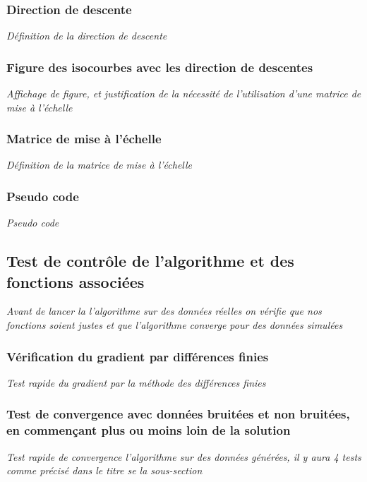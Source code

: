 \documentclass{article}
\begin{document}
\subsubsection{Direction de descente}
\textit{Définition de la direction de descente}

\subsubsection{Figure des isocourbes avec les direction de descentes}
\textit{Affichage de figure, et justification de la nécessité de l'utilisation d'une matrice de mise à l'échelle}

\subsubsection{Matrice de mise à l'échelle}
\textit{Définition de la matrice de mise à l'échelle}

\subsubsection{Pseudo code}
\textit{Pseudo code}

\subsection{Test de contrôle de l'algorithme et des fonctions associées}
\textit{Avant de lancer la l'algorithme sur des données réelles on vérifie que nos fonctions soient justes et que l'algorithme converge pour des données simulées}

\subsubsection{Vérification du gradient par différences finies}
\textit{Test rapide du gradient par la méthode des différences finies}

\subsubsection{Test de convergence avec données bruitées et non bruitées, en commençant plus ou moins loin de la solution}
\textit{Test rapide de convergence l'algorithme sur des données générées, il y aura 4 tests comme précisé dans le titre se la sous-section}
\end{document}
